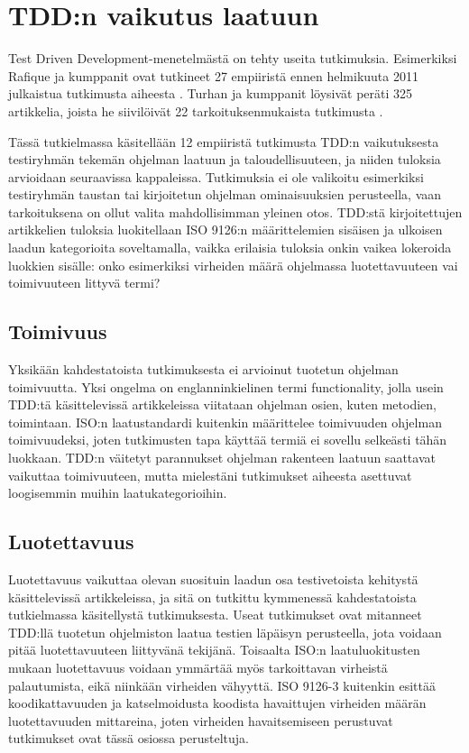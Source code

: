 \documentclass[finnish]{tktltiki2}
\theoremstyle{definition}
\theoremstyle{remark}
\begin{document}
\section{TDD:n vaikutus laatuun}

Test Driven Development-menetelmästä on tehty useita tutkimuksia. Esimerkiksi Rafique ja kumppanit ovat tutkineet 27 empiiristä ennen helmikuuta 2011 julkaistua tutkimusta aiheesta \cite{Rafique13}. Turhan ja kumppanit löysivät peräti 325 artikkelia, joista he siivilöivät 22 tarkoituksenmukaista tutkimusta \cite{Turhan10}.

Tässä tutkielmassa käsitellään 12 empiiristä tutkimusta TDD:n vaikutuksesta testiryhmän tekemän ohjelman laatuun ja taloudellisuuteen, ja niiden tuloksia arvioidaan seuraavissa kappaleissa. Tutkimuksia ei ole valikoitu esimerkiksi testiryhmän taustan tai kirjoitetun ohjelman ominaisuuksien perusteella, vaan tarkoituksena on ollut valita mahdollisimman yleinen otos. TDD:stä kirjoitettujen artikkelien tuloksia luokitellaan ISO 9126:n määrittelemien sisäisen ja ulkoisen laadun kategorioita soveltamalla, vaikka erilaisia tuloksia onkin vaikea lokeroida luokkien sisälle: onko esimerkiksi virheiden määrä ohjelmassa luotettavuuteen vai toimivuuteen littyvä termi? 





\subsection{Toimivuus}

Yksikään kahdestatoista tutkimuksesta ei arvioinut tuotetun ohjelman toimivuutta. Yksi ongelma on englanninkielinen termi functionality, jolla usein TDD:tä käsittelevissä artikkeleissa viitataan ohjelman osien, kuten metodien, toimintaan. ISO:n laatustandardi kuitenkin määrittelee toimivuuden ohjelman toimivuudeksi, joten tutkimusten tapa käyttää termiä ei sovellu selkeästi tähän luokkaan. TDD:n väitetyt parannukset ohjelman rakenteen laatuun saattavat vaikuttaa toimivuuteen, mutta mielestäni tutkimukset aiheesta asettuvat loogisemmin muihin laatukategorioihin.

\subsection{Luotettavuus}

Luotettavuus vaikuttaa olevan suosituin laadun osa testivetoista kehitystä käsittelevissä artikkeleissa, ja sitä on tutkittu kymmenessä kahdestatoista tutkielmassa käsitellystä tutkimuksesta. Useat tutkimukset ovat mitanneet TDD:llä tuotetun ohjelmiston laatua testien läpäisyn perusteella, jota voidaan pitää luotettavuuteen liittyvänä tekijänä. Toisaalta ISO:n laatuluokitusten mukaan luotettavuus voidaan ymmärtää myös tarkoittavan virheistä palautumista, eikä niinkään virheiden vähyyttä. ISO 9126-3 kuitenkin esittää koodikattavuuden ja katselmoidusta koodista havaittujen virheiden määrän luotettavuuden mittareina, joten virheiden havaitsemiseen perustuvat tutkimukset ovat tässä osiossa perusteltuja.
\end{document}
